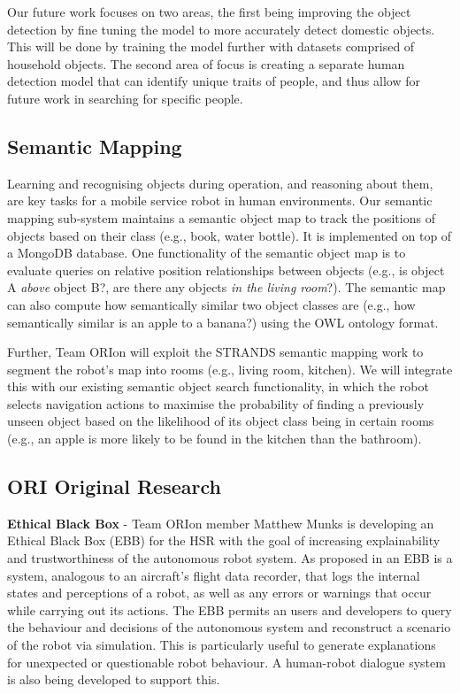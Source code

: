 \documentclass[runningheads,a4paper]{llncs}
\newcommand{\teamori}{Team ORIon}
\begin{document}
Our future work focuses on two areas, the first being improving the object detection by fine tuning the model to more accurately detect domestic objects. This will be done by training the model further with datasets comprised of household objects. The second area of focus is creating a separate human detection model that can identify unique traits of people, and thus allow for future work in searching for specific people.


\subsection{Semantic Mapping}
Learning and recognising objects during operation, and reasoning about them, are key tasks for a mobile service robot in human environments. Our semantic mapping sub-system maintains a semantic object map to track the positions of objects based on their class (e.g., book, water bottle). It is implemented on top of a MongoDB database. One functionality of the semantic object map is to evaluate queries on relative position relationships between objects (e.g., is object A \emph{above} object B?, are there any objects \emph{in the living room}?). The semantic map can also compute how semantically similar two object classes are (e.g., how semantically similar is an apple to a banana?) using the OWL ontology format. 

Further, \teamori{} will exploit the STRANDS semantic mapping work to segment the robot's map into rooms (e.g., living room, kitchen). We will integrate this with our existing semantic object search functionality, in which the robot selects navigation actions to maximise the probability of finding a previously unseen object based on the likelihood of its object class being in certain rooms (e.g., an apple is more likely to be found in the kitchen than the bathroom).

\subsection{ORI Original Research}

\textbf{Ethical Black Box} - \teamori{} member Matthew Munks is developing an Ethical Black Box (EBB) for the HSR with the goal of increasing explainability and trustworthiness of the autonomous robot system. As proposed in \cite{winfield2017} an EBB is a system, analogous to an aircraft's flight data recorder, that logs the internal states and perceptions of a robot, as well as any errors or warnings that occur while carrying out its actions. The EBB permits an users and developers to query the behaviour and decisions of the autonomous system and reconstruct a scenario of the robot via simulation. This is particularly useful to generate explanations for unexpected or questionable robot behaviour. A human-robot dialogue system is also being developed to support this.
\end{document}
